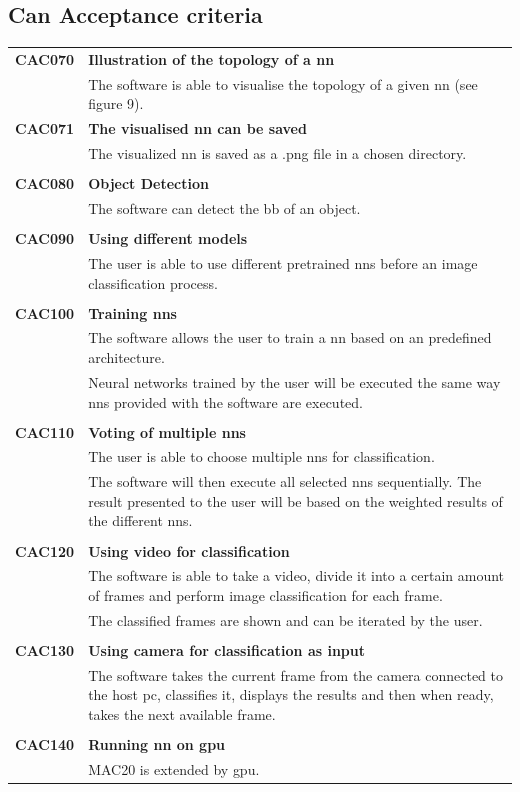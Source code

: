 \documentclass[parskip=full]{scrartcl}
\begin{document}
\subsection{Can Acceptance criteria}
\begin{tabular}{p{2cm}p{11.4cm}}
\textbf{CAC070} & \textbf{Illustration of the topology of a \gls{nn}} \\
& The software is able to visualise the topology of a given \gls{nn} (see figure 9). \\
\textbf{CAC071} & \textbf{The visualised \gls{nn} can be saved}\\
& The visualized \gls{nn} is saved as a .png file in a chosen directory.\\
& \\
\textbf{CAC080} & \textbf{Object Detection} \\
& The software can detect the \gls{bb} of an object. \\ 
& \\
\textbf{CAC090} &  \textbf{Using different models}\\
& The user is able to use different pretrained \glspl{nn} before an \gls{image classification} process. \\
& \\
\textbf{CAC100} & \textbf{Training \glspl{nn}} \\
& The software allows the user to train a \gls{nn} based on an predefined architecture.\\
& Neural networks trained by the user will be executed the same way \glspl{nn} provided with the software are executed.\\
& \\
\textbf{CAC110} & \textbf{Voting of multiple \glspl{nn}} \\
& The user is able to choose multiple \glspl{nn} for classification.\\
& The software will then execute all selected \glspl{nn} sequentially. The result presented to the user will be based on the weighted results of the different \glspl{nn}.\\
& \\
\textbf{CAC120} & \textbf{Using video for classification} \\
& The software is able to take a video, divide it into a certain amount of frames and perform \gls{image classification} for each frame.\\
& The classified frames are shown and can be iterated by the user. \\
& \\
\textbf{CAC130} & \textbf{Using camera for classification as input} \\
& The software takes the current frame from the camera connected to the \gls{host pc}, classifies it, displays the results and then when ready, takes the next available frame.\\
& \\
\textbf{CAC140} & \textbf{Running \gls{nn} on \gls{gpu}}\\
& MAC20 is extended by \gls{gpu}.\\
\end{tabular}
\end{document}
